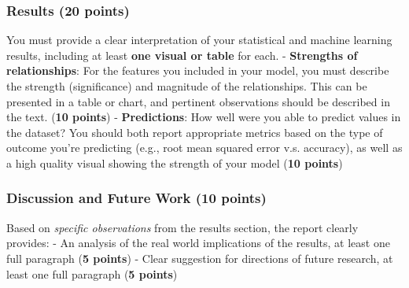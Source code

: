 \documentclass[
]{article}
\begin{document}
\hypertarget{results-20-points}{%
\subsubsection{\texorpdfstring{Results (\textbf{20
points})}{Results (20 points)}}\label{results-20-points}}

You must provide a clear interpretation of your statistical and machine
learning results, including at least \textbf{one visual or table} for
each. - \textbf{Strengths of relationships}: For the features you
included in your model, you must describe the strength (significance)
and magnitude of the relationships. This can be presented in a table or
chart, and pertinent observations should be described in the text.
(\textbf{10 points}) - \textbf{Predictions}: How well were you able to
predict values in the dataset? You should both report appropriate
metrics based on the type of outcome you're predicting (e.g., root mean
squared error v.s. accuracy), as well as a high quality visual showing
the strength of your model (\textbf{10 points})

\hypertarget{discussion-and-future-work-10-points}{%
\subsubsection{\texorpdfstring{Discussion and Future Work (\textbf{10
points})}{Discussion and Future Work (10 points)}}\label{discussion-and-future-work-10-points}}

Based on \emph{specific observations} from the results section, the
report clearly provides: - An analysis of the real world implications of
the results, at least one full paragraph (\textbf{5 points}) - Clear
suggestion for directions of future research, at least one full
paragraph (\textbf{5 points})
\end{document}

